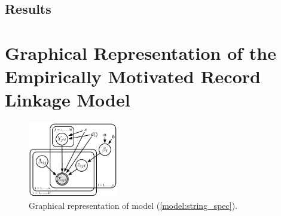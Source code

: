 \documentclass[11pt]{article}
\begin{document}
\subsection{Results}
\label{sec:results}





\clearpage
\newpage




\clearpage
\newpage

\appendix
\section{Graphical Representation of the Empirically Motivated Record Linkage Model}

\begin{figure}[htbp]
\begin{center}
\includegraphics[width=0.35\textwidth]{figures/recordLinkage_graphicalModel}
\caption{Graphical representation of model (\ref{model:string_spec}).}
\label{fig:graphicalProcess}
\end{center}
\end{figure}
\end{document}
